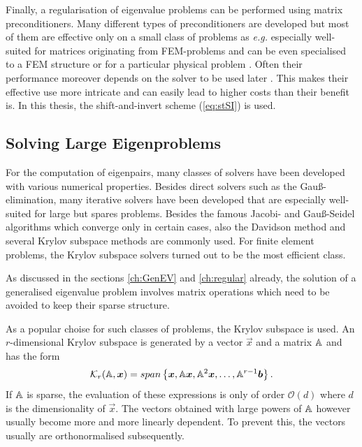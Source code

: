 Finally, a regularisation of eigenvalue problems can be performed using matrix preconditioners.
Many different types of preconditioners are developed \cite{Helmke2010} but most of them are effective only on a small class of problems as \textit{e.g.} especially well-suited for matrices originating from FEM-problems \cite{PrecFem, PrecFem2} and can be even specialised to a FEM structure \cite{MultPrec,MultPrec2} or for a particular physical problem \cite{HelmhPrec}. 
Often their performance moreover depends on the solver to be used later \cite{PrecKr}.
This makes their effective use more intricate and can easily lead to higher costs than their benefit is.
In this thesis, the shift-and-invert scheme (\ref{eq:stSI}) is used.

\subsection{Solving Large Eigenproblems}
\label{ch:ghep}
For the computation of eigenpairs, many classes of solvers have been developed with various numerical properties.
Besides direct solvers such as the Gau\ss-elimination, many iterative solvers have been developed that are especially well-suited for large but spares problems.
Besides the famous Jacobi- and Gau\ss-Seidel algorithms which converge only in certain cases, also the Davidson method and several Krylov subspace methods are commonly used.
For finite element problems, the Krylov subspace solvers turned out to be the most efficient class.

As discussed in the sections \ref{ch:GenEV} and \ref{ch:regular} already, the solution of a generalised eigenvalue problem involves matrix operations which need to be avoided to keep their sparse structure.

As a popular choise for such classes of problems, the Krylov subspace is used.
An $r$-dimensional Krylov subspace is generated by a vector $\vec{x}$ and a matrix $\mathbb{A}$ and has the form
\begin{equation}
   \mathcal{K}_r(\mathbb{A},\bm{x})=span\left\{ \bm{x},\mathbb{A}\bm{x},\mathbb{A}^2\bm{x},\hdots,\mathbb{A}^{r-1}\bm{b} \right\}.
\end{equation}
If $\mathbb{A}$ is sparse, the evaluation of these expressions is only of order $\mathcal{O}(d)$ where $d$ is the dimensionality of $\vec{x}$.
The vectors obtained with large powers of $\mathbb{A}$ however usually become more and more linearly dependent.
To prevent this, the vectors usually are orthonormalised subsequently.

